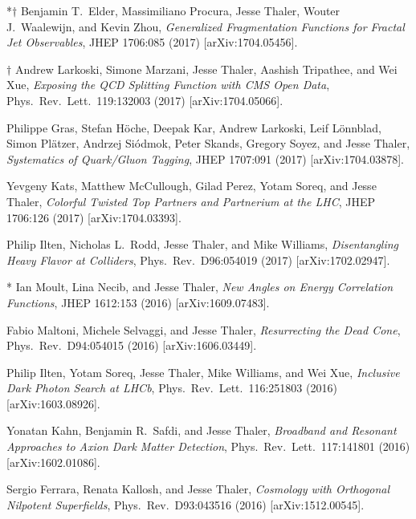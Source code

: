 \begin{list}{[]\addtocounter{jessecount}{-1}}{\leftmargin=3em \itemsep=4pt}
\item
*$\dagger$ Benjamin T.\ Elder, Massimiliano Procura, Jesse Thaler, Wouter J.\ Waalewijn, and Kevin Zhou,
\emph{Generalized Fragmentation Functions for Fractal Jet Observables},
JHEP 1706:085 (2017)
[arXiv:1704.05456].

\item
$\dagger$ Andrew Larkoski, Simone Marzani, Jesse Thaler, Aashish Tripathee, and Wei Xue,
\emph{Exposing the QCD Splitting Function with CMS Open Data},
Phys.\ Rev.\ Lett.\ 119:132003 (2017)
[arXiv:1704.05066].

\item
 Philippe Gras, Stefan Höche, Deepak Kar, Andrew Larkoski, Leif Lönnblad, Simon Plätzer, Andrzej Siódmok, Peter Skands, Gregory Soyez, and Jesse Thaler,
\emph{Systematics of Quark/Gluon Tagging},
JHEP 1707:091 (2017)
[arXiv:1704.03878].

\item
 Yevgeny Kats, Matthew McCullough, Gilad Perez, Yotam Soreq, and Jesse Thaler,
\emph{Colorful Twisted Top Partners and Partnerium at the LHC},
JHEP 1706:126 (2017)
[arXiv:1704.03393].

\item
 Philip Ilten, Nicholas L.\ Rodd, Jesse Thaler, and Mike Williams,
\emph{Disentangling Heavy Flavor at Colliders},
Phys.\ Rev.\ D96:054019 (2017)
[arXiv:1702.02947].

\item
* Ian Moult, Lina Necib, and Jesse Thaler,
\emph{New Angles on Energy Correlation Functions},
JHEP 1612:153 (2016)
[arXiv:1609.07483].

\item
 Fabio Maltoni, Michele Selvaggi, and Jesse Thaler,
\emph{Resurrecting the Dead Cone},
Phys.\ Rev.\ D94:054015 (2016)
[arXiv:1606.03449].

\item
 Philip Ilten, Yotam Soreq, Jesse Thaler, Mike Williams, and Wei Xue,
\emph{Inclusive Dark Photon Search at LHCb},
Phys.\ Rev.\ Lett.\ 116:251803 (2016)
[arXiv:1603.08926].

\item
 Yonatan Kahn, Benjamin R.\ Safdi, and Jesse Thaler,
\emph{Broadband and Resonant Approaches to Axion Dark Matter Detection},
Phys.\ Rev.\ Lett.\ 117:141801 (2016)
[arXiv:1602.01086].

\item
 Sergio Ferrara, Renata Kallosh, and Jesse Thaler,
\emph{Cosmology with Orthogonal Nilpotent Superfields},
Phys.\ Rev.\ D93:043516 (2016)
[arXiv:1512.00545].


\end{list}
